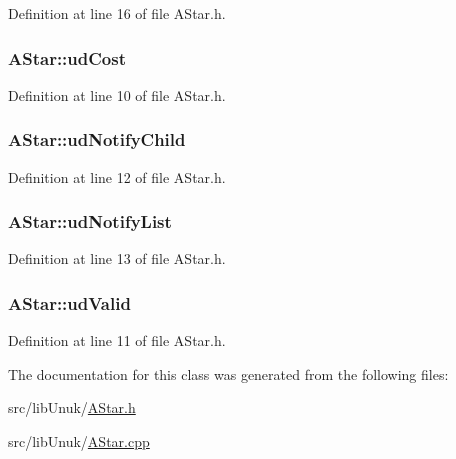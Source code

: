Definition at line 16 of file AStar.h.

\hypertarget{class_a_star_a6daaa58fc52045c6a4fad6b7a1fec60a}{
\subsubsection[{udCost}]{ {\bf AStar::udCost}}}
\label{class_a_star_a6daaa58fc52045c6a4fad6b7a1fec60a}


Definition at line 10 of file AStar.h.

\hypertarget{class_a_star_ab5a6376f40d9746e71447acb3b8a05bd}{
\subsubsection[{udNotifyChild}]{ {\bf AStar::udNotifyChild}}}
\label{class_a_star_ab5a6376f40d9746e71447acb3b8a05bd}


Definition at line 12 of file AStar.h.

\hypertarget{class_a_star_a1a4896338d482138954cfbfbd9e93641}{
\subsubsection[{udNotifyList}]{ {\bf AStar::udNotifyList}}}
\label{class_a_star_a1a4896338d482138954cfbfbd9e93641}


Definition at line 13 of file AStar.h.

\hypertarget{class_a_star_a2c97615a0ad52039bec2a7ceaab772a2}{
\subsubsection[{udValid}]{ {\bf AStar::udValid}}}
\label{class_a_star_a2c97615a0ad52039bec2a7ceaab772a2}


Definition at line 11 of file AStar.h.



The documentation for this class was generated from the following files:\begin{DoxyCompactItemize}
\item 
src/libUnuk/\hyperlink{_a_star_8h}{AStar.h}\item 
src/libUnuk/\hyperlink{_a_star_8cpp}{AStar.cpp}\end{DoxyCompactItemize}
